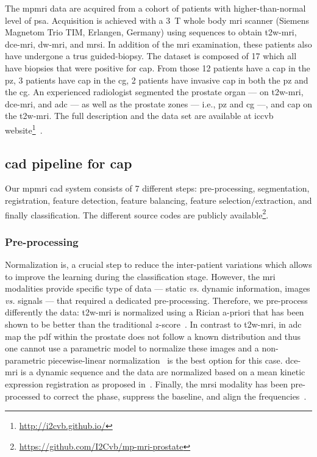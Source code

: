 \documentclass[conference]{sty/ieeeconf}
\begin{document}
The \ac{mpmri} data are acquired from a cohort of patients with
higher-than-normal level of \ac{psa}.
Acquisition is achieved with a \SI{3}{\tesla} whole body
\ac{mri} scanner (Siemens Magnetom Trio TIM, Erlangen, Germany) using
sequences to obtain \ac{t2w}-\ac{mri}, \ac{dce}-\ac{mri},
\ac{dw}-\ac{mri}, and \ac{mrsi}.
In addition of the \ac{mri} examination, these patients also have undergone
a \ac{trus} guided-biopsy.
The dataset is composed of 17 which all have biopsies that were positive for
\ac{cap}.
From those 12 patients have a \ac{cap} in the \ac{pz}, 3 patients
have \ac{cap} in the \ac{cg}, 2 patients have invasive \ac{cap} in
both the \ac{pz} and the \ac{cg}.
An experienced radiologist segmented the prostate organ --- on
\ac{t2w}-\ac{mri}, \ac{dce}-\ac{mri}, and \ac{adc} --- as
well as the prostate zones --- i.e., \ac{pz} and \ac{cg} ---, and
\ac{cap} on the \ac{t2w}-\ac{mri}.
The full description and the data set are available at \acs*{iccvb}
website\footnote{\url{http://i2cvb.github.io/}}~\cite{Lemaitre2016thesis}.

\subsection{\acs*{cad} pipeline for \acs*{cap}}

Our \ac{mpmri} \ac{cad} system consists of 7 different steps:
pre-processing, segmentation, registration, feature detection, feature
balancing, feature selection/extraction, and finally classification.
The different source codes are publicly
available\footnote{\url{https://github.com/I2Cvb/mp-mri-prostate}}.

\subsubsection{Pre-processing}\label{subsec:chp6:method:PP}

Normalization is, a crucial step to reduce the inter-patient
variations which allows to improve the learning during the
classification stage.
However, the \ac{mri} modalities provide specific type of data --- static
\emph{vs.} dynamic information, images \emph{vs.} signals --- that
required a dedicated pre-processing.
Therefore, we pre-process differently the data:
\ac{t2w}-\ac{mri} is normalized using a Rician
a-priori that has been shown to be better than the traditional
$z$-score~\cite{lemaitre2016normalization}.
In contrast to \ac{t2w}-\ac{mri}, in \ac{adc} map the \ac{pdf} within the
prostate does not follow a known distribution and thus one cannot use
a parametric model to normalize these images and a non-parametric
piecewise-linear normalization~\cite{Nyul2000} is the best option for
this case.
\ac{dce}-\ac{mri} is a dynamic sequence and the data are normalized
based on a mean kinetic expression registration as proposed
in~\cite{Lemaitre2016thesis}.
Finally, the \ac{mrsi} modality has been pre-processed to correct the
phase, suppress the baseline, and align the frequencies~\cite{Parfait2012}.
\end{document}
